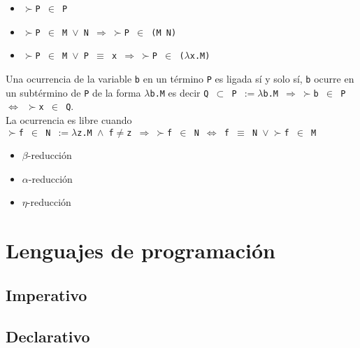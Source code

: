 \begin{defn}\end{defn}
\begin{itemize}
\item \texttt{$\succ$P $\in$ P}
\item \texttt{$\succ$P $\in$ M $\vee$ N $\Rightarrow \ \succ$P $\in$ (M N)}
\item \texttt{$\succ$P $\in$ M $\vee$ P $\equiv$ x $\Rightarrow \ \succ$P $\in$ ($\lambda$x.M)}
\end{itemize}

\begin{defn}\end{defn}
Una ocurrencia de la variable \texttt{b} en un término \texttt{P} es ligada sí y solo sí, \texttt{b} ocurre en un subtérmino de \texttt{P} de la forma \texttt{$\lambda$b.M} es decir 
\texttt{Q $\subset $ P $ := \lambda$b.M
$\Rightarrow \ \succ$b $\in$ P $\Leftrightarrow$ 
$\succ$x $\in$ Q}. \\
La ocurrencia es libre cuando \\
\texttt{$\succ$f $\in$ N $ := \lambda$z.M $\wedge$
f$\neq$z 
$\Rightarrow \ \succ$f $\in$ N $\Leftrightarrow  
$ f $\equiv$ N $\vee \ \succ$f $\in$ M }


\begin{defn}\end{defn}
\begin{itemize}
\item $\beta$-reducción
\item $\alpha$-reducción
\item $\eta$-reducción
\end{itemize}

\section{Lenguajes de programación}

\subsection{Imperativo}

\subsection{Declarativo}